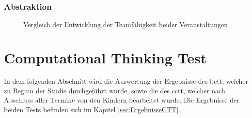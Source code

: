 \subsubsection{Abstraktion}
\begin{figure}[H]
	\centering
	\caption[Vergleich Entwicklung Teamfähigkeit beider Veranstaltungen]{Vergleich der Entwicklung der Teamfähigkeit beider Veranstaltungen}
\end{figure}

\section{Computational Thinking Test}
	In dem folgenden Abschnitt wird die Auswertung der Ergebnisse des \acrshort{bctt}, welcher zu Beginn der Studie durchgeführt wurde, sowie die des \acrshort{cctt}, welcher nach Abschluss aller Termine von den Kindern bearbeitet wurde. Die Ergebnisse der beiden Tests befinden sich im Kapitel \ref{sec:ErgebnisseCTT}.
